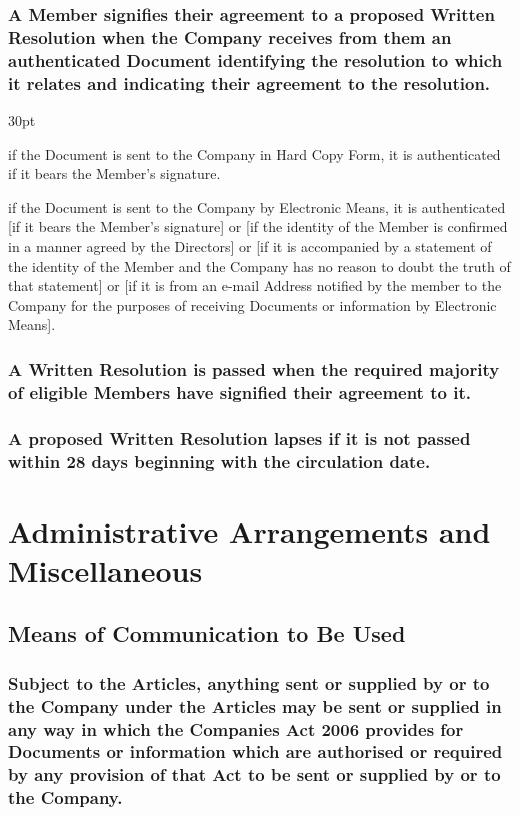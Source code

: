 \documentclass[12pt]{article}
\def\clauseindent{30pt}
\newenvironment{subindentpara}{\raggedright\begin{adjustwidth}{\clauseindent}{}\begin{hanginglist}}{\end{hanginglist}\end{adjustwidth}}
\begin{document}
\subsubsection[Responses to Written Resolutions]{A Member signifies their agreement to a proposed Written Resolution when the Company receives from them an authenticated Document identifying the resolution to which it relates and indicating their agreement to the resolution.}
\begin{subindentpara}
    \item if the Document is sent to the Company in Hard Copy Form, it is authenticated if it bears the Member's signature.
    \item if the Document is sent to the Company by Electronic Means, it is authenticated [if it bears the Member's signature] or [if the identity of the Member is confirmed in a manner agreed by the Directors] or [if it is accompanied by a statement of the identity of the Member and the Company has no reason to doubt the truth of that statement] or [if it is from an e-mail Address notified by the member to the Company for the purposes of receiving Documents or information by Electronic Means].
\end{subindentpara}
\subsubsection[Passing of Written Resolutions]{A Written Resolution is passed when the required majority of eligible Members have signified their agreement to it.}
\subsubsection[Lapsing of Written Resolutions]{A proposed Written Resolution lapses if it is not passed within 28 days beginning with the circulation date.}

\newpage\section*{Administrative Arrangements and Miscellaneous}

\subsection{Means of Communication to Be Used}
\subsubsection[Specifics of Communication to Be Used]{Subject to the Articles, anything sent or supplied by or to the Company under the Articles may be sent or supplied in any way in which the Companies Act 2006 provides for Documents or information which are authorised or required by any provision of that Act to be sent or supplied by or to the Company.}
\end{document}
